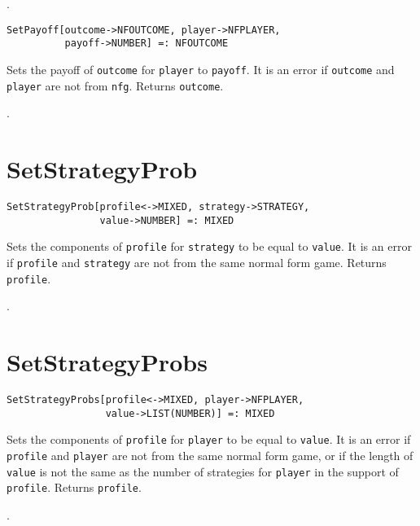\seealso {}.

\newsignature

\begin{verbatim}
SetPayoff[outcome->NFOUTCOME, player->NFPLAYER, 
          payoff->NUMBER] =: NFOUTCOME 
\end{verbatim}

\noindent
Sets the payoff of \verb+outcome+ for \verb+player+ to \verb+payoff+.
It is an error if \verb+outcome+ and \verb+player+ are not from \verb+nfg+.
Returns \verb+outcome+.

\seealso {}.


\section*{SetStrategyProb}\label{PrimSetStrategyProb}
\begin{verbatim}
SetStrategyProb[profile<->MIXED, strategy->STRATEGY, 
                value->NUMBER] =: MIXED 
\end{verbatim}

\noindent
Sets the components of \verb+profile+ for \verb+strategy+ to be equal
to \verb+value+.  It is an error if \verb+profile+ and \verb+strategy+
are not from the same normal form game.  Returns \verb+profile+.

\seealso {}.


\section*{SetStrategyProbs}\label{PrimSetStrategyProbs}
\begin{verbatim}
SetStrategyProbs[profile<->MIXED, player->NFPLAYER, 
                 value->LIST(NUMBER)] =: MIXED 
\end{verbatim}

\noindent
Sets the components of \verb+profile+ for \verb+player+ to be equal
to \verb+value+.  It is an error if \verb+profile+ and \verb+player+
are not from the same normal form game, or if the length of \verb+value+
is not the same as the number of strategies for \verb+player+ in the
support of \verb+profile+.  Returns \verb+profile+.

\seealso {}.


